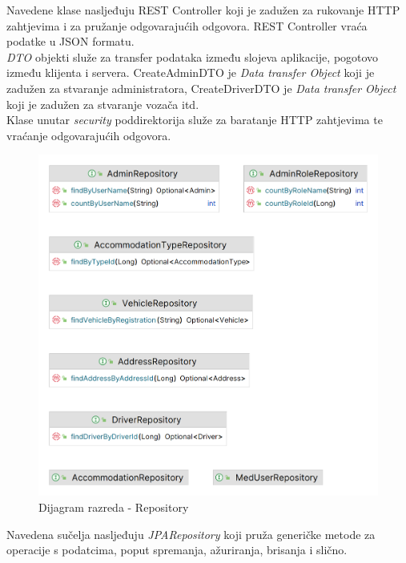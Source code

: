 			{Navedene klase nasljeđuju REST Controller koji je zadužen za rukovanje HTTP zahtjevima i za pružanje odgovarajućih odgovora. REST Controller vraća podatke u JSON formatu. \\
			\textit{DTO} objekti služe za transfer podataka između slojeva aplikacije, pogotovo između klijenta i servera.	 
			CreateAdminDTO je \textit{Data transfer Object} koji je zadužen za stvaranje administratora, CreateDriverDTO je \textit{Data transfer Object} koji je zadužen za stvaranje vozača itd.  \\
			Klase unutar \textit{security} poddirektorija služe za baratanje HTTP zahtjevima te vraćanje odgovarajućih odgovora.
			}
			
			\begin{figure}[H]
				\includegraphics[width=\textwidth]{slike/dao.PNG}
				\caption{Dijagram razreda - Repository}
				\label{repositoryDiagram}
			\end{figure}
			
			{Navedena sučelja nasljeđuju \textit{JPARepository} koji pruža generičke metode za operacije s podatcima, poput spremanja, ažuriranja, brisanja i slično.}\\
			
